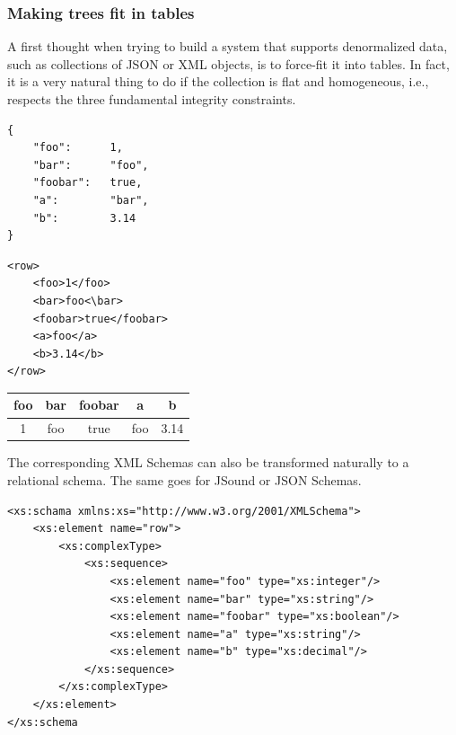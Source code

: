 \subsubsection{Making trees fit in tables}

A first thought when trying to build a system that supports denormalized data, such as collections of JSON or XML objects, is to force-fit it into tables. In fact, it is a very natural thing to do if the collection is flat and homogeneous, i.e., respects the three fundamental integrity constraints.

\vspace{1\baselineskip}

\begin{minipage}{0.26\textwidth}
\begin{lstlisting}[style=json,caption={JSON Object}]
{
    "foo":      1,
    "bar":      "foo",
    "foobar":   true,
    "a":        "bar",
    "b":        3.14
}
\end{lstlisting}
\end{minipage}
\hfill
\begin{minipage}{0.3\textwidth}
\begin{lstlisting}[style=xml,caption={XML Object}]
<row>
    <foo>1</foo>
    <bar>foo<\bar>
    <foobar>true</foobar>
    <a>foo</a>
    <b>3.14</b>
</row>
\end{lstlisting}
\end{minipage}
\hfill
\begin{minipage}{0.3\textwidth}
\begin{tabular}{c|c|c|c|c}
    foo & bar & foobar & a & b \\ \hline
    1 & foo & true & foo & 3.14
\end{tabular}
\end{minipage}

The corresponding XML Schemas can also be transformed naturally to a relational schema. The same goes for JSound or JSON Schemas.

\begin{lstlisting}[style=xml,caption={XML Schema}]
<xs:schama xmlns:xs="http://www.w3.org/2001/XMLSchema">
    <xs:element name="row">
        <xs:complexType>
            <xs:sequence>
                <xs:element name="foo" type="xs:integer"/>
                <xs:element name="bar" type="xs:string"/>
                <xs:element name="foobar" type="xs:boolean"/>
                <xs:element name="a" type="xs:string"/>
                <xs:element name="b" type="xs:decimal"/>
            </xs:sequence>
        </xs:complexType>
    </xs:element>
</xs:schema
\end{lstlisting}   

